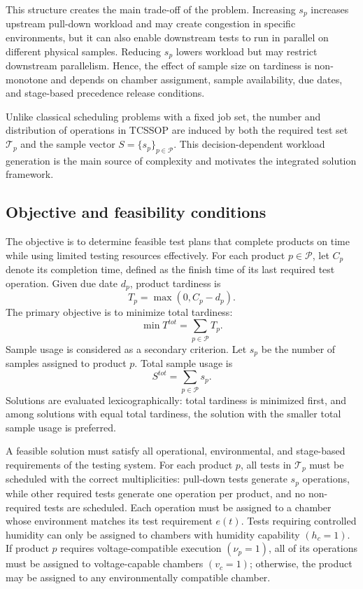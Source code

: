 \documentclass[11pt]{article}
\begin{document}
This structure creates the main trade-off of the problem. Increasing \(s_p\) increases upstream pull-down workload and may create congestion in specific environments, but it can also enable downstream tests to run in parallel on different physical samples. Reducing \(s_p\) lowers workload but may restrict downstream parallelism. Hence, the effect of sample size on tardiness is non-monotone and depends on chamber assignment, sample availability, due dates, and stage-based precedence release conditions.

Unlike classical scheduling problems with a fixed job set, the number and distribution of operations in TCSSOP are induced by both the required test set \(\mathcal{T}_p\) and the sample vector \(S=\{s_p\}_{p\in\mathcal{P}}\). This decision-dependent workload generation is the main source of complexity and motivates the integrated solution framework.

\subsection{Objective and feasibility conditions}
\label{subsec:objective_feasibility}

The objective is to determine feasible test plans that complete products on time while using limited testing resources effectively. For each product \(p\in\mathcal{P}\), let \(C_p\) denote its completion time, defined as the finish time of its last required test operation. Given due date \(d_p\), product tardiness is
\[
T_p=\max(0,C_p-d_p).
\]
The primary objective is to minimize total tardiness:
\[
\min T^{tot}=\sum_{p\in\mathcal{P}}T_p.
\]
Sample usage is considered as a secondary criterion. Let \(s_p\) be the number of samples assigned to product \(p\). Total sample usage is
\[
S^{tot}=\sum_{p\in\mathcal{P}}s_p.
\]
Solutions are evaluated lexicographically: total tardiness is minimized first, and among solutions with equal total tardiness, the solution with the smaller total sample usage is preferred.

A feasible solution must satisfy all operational, environmental, and stage-based requirements of the testing system. For each product \(p\), all tests in \(\mathcal{T}_p\) must be scheduled with the correct multiplicities: pull-down tests generate \(s_p\) operations, while other required tests generate one operation per product, and no non-required tests are scheduled. Each operation must be assigned to a chamber whose environment matches its test requirement \(e(t)\). Tests requiring controlled humidity can only be assigned to chambers with humidity capability \((h_c=1)\). If product \(p\) requires voltage-compatible execution \((\nu_p=1)\), all of its operations must be assigned to voltage-capable chambers \((v_c=1)\); otherwise, the product may be assigned to any environmentally compatible chamber.
\end{document}
